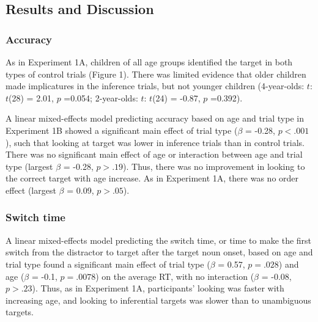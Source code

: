 \documentclass[a4paper,man,apacite,floatsintext]{apa6}
\begin{document}
\subsection{Results and Discussion}\label{results-and-discussion}

\subsubsection{Accuracy}\label{accuracy-1}

As in Experiment 1A, children of all age groups identified the target in
both types of control trials (Figure 1). There was limited evidence that
older children made implicatures in the inference trials, but not
younger children (4-year-olds: \(t\): \(t\)(28) = 2.01, \(p\) =0.054;
2-year-olds: \(t\): \(t\)(24) = -0.87, \(p\) =0.392).

A linear mixed-effects model predicting accuracy based on age and trial
type in Experiment 1B showed a significant main effect of trial type
(\(\beta\) = -0.28, \(p <.001\)), such that looking at target was lower
in inference trials than in control trials. There was no significant
main effect of age or interaction between age and trial type (largest
\(\beta\) = -0.28, \(p >.19\)). Thus, there was no improvement in
looking to the correct target with age increase. As in Experiment 1A,
there was no order effect (largest \(\beta\) = 0.09, \(p >.05\)).

\subsubsection{Switch time}\label{switch-time-1}

A linear mixed-effects model predicting the switch time, or time to make
the first switch from the distractor to target after the target noun
onset, based on age and trial type found a significant main effect of
trial type (\(\beta\) = 0.57, \(p =.028\)) and age (\(\beta\) = -0.1,
\(p =.0078\)) on the average RT, with no interaction (\(\beta\) = -0.08,
\(p >.23\)). Thus, as in Experiment 1A, participants' looking was faster
with increasing age, and looking to inferential targets was slower than
to unambiguous targets.
\end{document}
